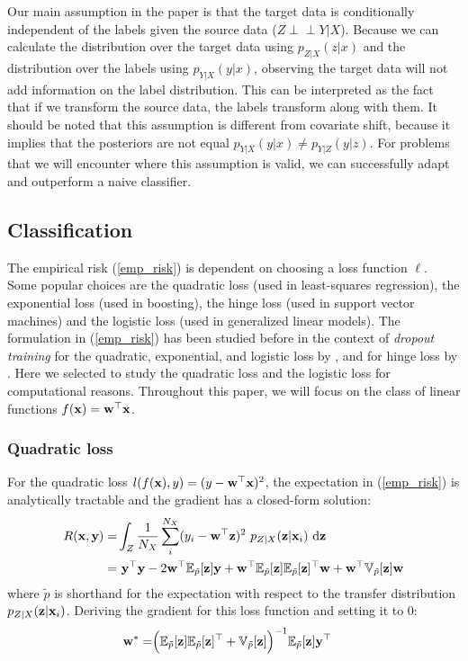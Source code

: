 \documentclass[twoside,11pt]{article}
\def\ci{\perp\!\!\!\perp}
\begin{document}
Our main assumption in the paper is that the target data is conditionally independent of the labels given the source data ($Z \ci Y | X$). Because we can calculate the distribution over the target data using $p_{Z|X}(z|x)$ and the distribution over the labels using $p_{Y|X}(y|x)$, observing the target data will not add information on the label distribution.  This can be interpreted as the fact that if we transform the source data, the labels transform along with them. It should be noted that this assumption is different from covariate shift, because it implies that the posteriors are not equal $p_{Y|X}(y|x) \neq p_{Y|Z}(y|z)$. For problems that we will encounter where this assumption is valid, we can successfully adapt and outperform a naive classifier.

\subsection{Classification}
The empirical risk (\ref{emp_risk}) is dependent on choosing a loss function $\ell$. Some popular choices are the quadratic loss (used in least-squares regression), the exponential loss (used in boosting), the hinge loss (used in support vector machines) and the logistic loss (used in generalized linear models). The formulation in (\ref{emp_risk}) has been studied before in the context of \emph{dropout training} for the quadratic, exponential, and logistic loss by \cite{wager2013dropout,van2013learning}, and for hinge loss by \cite{chen2014dropout}. Here we selected to study the quadratic loss and the logistic loss for computational reasons. %
Throughout this paper, we will focus on the class of linear functions $f({\bf x}) = {\bf w^{\top}x}$. %

\subsubsection{Quadratic loss}
For the quadratic loss $l(f({\bf x}),y)=(y-{\bf w}^{\top}{\bf x})^{2}$, the expectation in (\ref{emp_risk}) is analytically tractable and the gradient has a closed-form solution:
\begin{align}
	R({\bf x},{\bf y}) =& \int_{Z} \frac{1}{N_{X}}\sum_{i}^{N_{X}} (y_{i}-{\bf w}^{\top} {\bf z})^{2} \ p_{Z|X}({\bf z}|{\bf x}_{i}) \ \mathrm{d}{\bf z} \nonumber \\
	=& \  {\bf y^{\top}y} - 2{\bf w}^{\top}\mathbb{E}_{\tilde{p}}[{\bf z]y} + {\bf w}^{\top}\mathbb{E}_{\tilde{p}}[{\bf z}]\mathbb{E}_{\tilde{p}}[{\bf z]^{\top}w}   + {\bf w}^{\top}\mathbb{V}_{\tilde{p}}[{\bf z]w} \label{qd_loss}
\end{align}
where $\tilde{p}$ is shorthand for the expectation with respect to the transfer distribution $p_{Z|X}({\bf z}|{\bf x}_{i})$. Deriving the gradient for this loss function and setting it to $0$:
\begin{align}
{\bf w}^{*} =& \Big( \mathbb{E}_{\tilde{p}}[{\bf z}] \mathbb{E}_{\tilde{p}}[{\bf z}]^{\top} + \mathbb{V}_{\tilde{p}}[{\bf z}] \Big)^{-1} \mathbb{E}_{\tilde{p}}[{\bf z}]{\bf y}^{\top}
\end{align}
\end{document}
